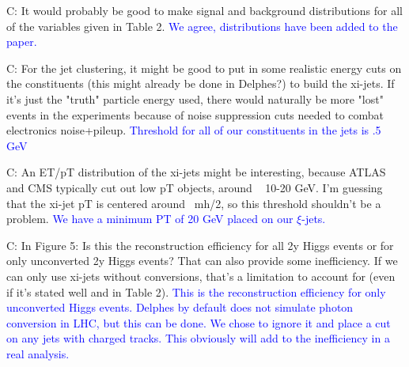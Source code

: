 \documentclass[12pt]{article}
\begin{document}
C: It would probably be good to make signal and background distributions for all of the variables given in Table 2.
\vskip 0.12in
\textcolor{blue}{We agree, distributions have been added to the paper.}
\vskip 0.12in

C: For the jet clustering, it might be good to put in some realistic energy cuts on the constituents (this might already be done in Delphes?) to build the xi-jets. If it's just the "truth" particle energy used, there would naturally be more "lost" events in the experiments because of noise suppression cuts needed to combat electronics noise+pileup. 
\vskip 0.12in
\textcolor{blue}{Threshold for all of our constituents in the jets is .5 GeV}
\vskip 0.12in

C: An ET/pT distribution of the xi-jets might be interesting, because ATLAS and CMS typically cut out low pT objects, around ~ 10-20 GeV. I'm guessing that the xi-jet pT is centered around ~mh/2, so this threshold shouldn't be a problem.
\vskip 0.12in
\textcolor{blue}{We have a minimum PT of 20 GeV placed on our $\xi$-jets.}
\vskip 0.12in

C: In Figure 5: Is this the reconstruction efficiency for all 2y Higgs events or for only unconverted 2y Higgs events? That can also provide some inefficiency. If we can only use xi-jets without conversions, that's a limitation to account for (even if it's stated well and in Table 2).
\vskip 0.12in
\textcolor{blue}{This is the reconstruction efficiency for only unconverted Higgs events. Delphes by default does not simulate photon conversion in LHC, but this can be done. We chose to ignore it and place a cut on any jets with charged tracks. This obviously will add to the inefficiency in a real analysis.}
\vskip 0.12in
\end{document}
